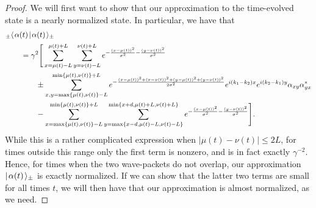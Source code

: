 \documentclass[../thesis-main/thesis-main]{subfiles}
\begin{document}
\begin{proof}
We will first want to show that our approximation to the time-evolved state is a nearly normalized state.  In particular, we have that
\begin{align}
  &{}_\pm\langle\mspace{2mu} \alpha(t) \mspace{2mu} | \mspace{2mu} \alpha(t)\mspace{2mu} \rangle_\pm \nonumber\\
  &\qquad = \gamma^2 \Bigg[\sum_{x=\mu(t)-L}^{\mu(t)+L} \sum_{y=\nu(t)-L}^{\nu(t)+L} e^{-\frac{(x-\mu(t))^2}{\sigma^2} - \frac{(y-\nu(t))^2}{\sigma^2}} \nonumber\\
  &\qquad \qquad \pm  \sum_{x,y=\max\{\mu(t),\nu(t)\}-L}^{\min\{\mu(t),\nu(t)\}+L} e^{-\frac{(x-\mu(t))^2 + (x-\nu(t))^2 + (y-\mu(t))^2+(y-\nu(t))^2}{2\sigma^2}}e^{i (k_1-k_2) x}e^{i(k_2-k_1)y} \alpha_{xy}\alpha_{yx}^* \nonumber\\
  &\qquad \qquad - \sum_{x=\max\{\mu(t),\nu(t)\}-L}^{\min\{\mu(t),\nu(t)\}+L}\sum_{y=\max\{x-d,\mu(t)-L,\nu(t)-L\}}^{\min\{x+d,\mu(t)+L,\nu(t)+L\}} e^{-\frac{(x-\mu(t))^2}{\sigma^2} - \frac{(y-\nu(t))^2}{\sigma^2}} \Bigg].\label{eq:approximation_ip}
\end{align}
While this is a rather complicated expression when $|\mu(t) - \nu(t)| \leq 2L$, for times outside this range only the first term is nonzero, and is in fact exactly $\gamma^{-2}$.  Hence, for times when the two wave-packets do not overlap, our approximation $|\mspace{2mu} \alpha(t) \mspace{2mu} \rangle_{\pm}$ is exactly normalized.  If we can show that the latter two terms are small for all times $t$, we will then have that our approximation is almost normalized, as we need.


\end{proof}
\end{document}
